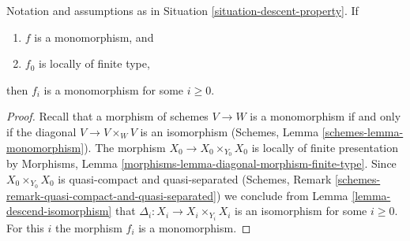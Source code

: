 \begin{lemma}
\label{lemma-descend-monomorphism}
Notation and assumptions as in Situation \ref{situation-descent-property}.
If
\begin{enumerate}
\item $f$ is a monomorphism, and
\item $f_0$ is locally of finite type,
\end{enumerate}
then $f_i$ is a monomorphism for some $i \geq 0$.
\end{lemma}

\begin{proof}
Recall that a morphism of schemes $V \to W$ is a monomorphism if and
only if the diagonal $V \to V \times_W V$ is an isomorphism
(Schemes, Lemma \ref{schemes-lemma-monomorphism}).
The morphism $X_0 \to X_0 \times_{Y_0} X_0$ is locally of finite
presentation by
Morphisms, Lemma \ref{morphisms-lemma-diagonal-morphism-finite-type}.
Since $X_0 \times_{Y_0} X_0$ is quasi-compact and quasi-separated
(Schemes, Remark \ref{schemes-remark-quasi-compact-and-quasi-separated})
we conclude from
Lemma \ref{lemma-descend-isomorphism}
that $\Delta_i : X_i \to X_i \times_{Y_i} X_i$ is an isomorphism for
some $i \geq 0$. For this $i$ the morphism $f_i$ is a monomorphism.
\end{proof}
